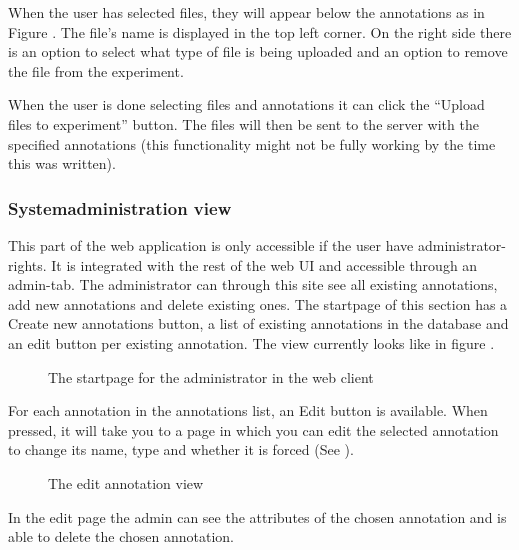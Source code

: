 When the user has selected files, they will appear below the annotations as in Figure . The file’s name is displayed in the top left corner. On the right side there is an option to select what type of file is being uploaded and an option to remove the file from the experiment.

When the user is done selecting files and annotations it can click the “Upload files to experiment” button. The files will then be sent to the server with the specified annotations (this functionality might not be fully working by the time this was written).

\subsubsection{Systemadministration view}

This part of the web application is only accessible if the user have administrator-rights. It is integrated with the rest of the web UI and accessible through an admin-tab. The administrator can through this site see all existing annotations, add new annotations and delete existing ones.
The startpage of this section has a Create new annotations button, a list of existing annotations in the database and an edit button per existing annotation. 
The view currently looks like in figure . 

\begin{figure}[h]
 \caption{The startpage for the administrator in the web client}
 \label{adm__web_annotationView}
\end{figure}

For each annotation in the annotations list, an Edit button is available. 
When pressed, it will take you to a page in which you can edit the selected annotation to change its name, 
type and whether it is forced (See ). 

\begin{figure}[h]
 \caption{The edit annotation view}
 \label{adm_web_editView}
\end{figure}
\newpage
In the edit page the admin can see the attributes of the chosen annotation and is able to delete the chosen annotation.

